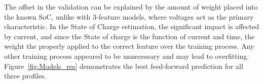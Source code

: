     The offset in the validation can be explained by the amount of weight placed into the known SoC, unlike with 3-feature models, where voltages act as the primary characteristic.
    In the State of Charge estimation, the significant impact is affected by current, and since the State of charge is the function of current and time, the weight the properly applied to the correct feature over the training process.
    Any other training process appeared to be unnecessary and may lead to overfitting.
    \mbox{Figure~\ref{fig:Models_res}} demonstrates the best feed-forward prediction for all three profiles.
